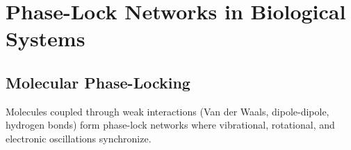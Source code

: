 \section{Phase-Lock Networks in Biological Systems}

\subsection{Molecular Phase-Locking}

\begin{theorem}
\label{thm:weak_interaction_locking}
Molecules coupled through weak interactions (Van der Waals, dipole-dipole, hydrogen bonds) form phase-lock networks where vibrational, rotational, and electronic oscillations synchronize.
\end{theorem}

